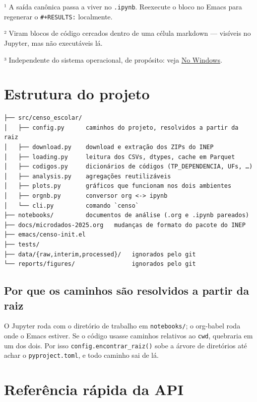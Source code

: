 \documentclass[11pt]{article}
\begin{document}
¹ A saída canônica passa a viver no \texttt{.ipynb}. Reexecute o bloco no Emacs para
regenerar o \texttt{\#+RESULTS:} localmente.

² Viram blocos de código cercados dentro de uma célula markdown — visíveis no
Jupyter, mas não executáveis lá.

³ Independente do sistema operacional, de propósito: veja \hyperref[sec:org266169a]{No Windows}.
\section*{Estrutura do projeto}
\label{sec:orgf6c494e}

\begin{verbatim}
├── src/censo_escolar/
│   ├── config.py      caminhos do projeto, resolvidos a partir da raiz
│   ├── download.py    download e extração dos ZIPs do INEP
│   ├── loading.py     leitura dos CSVs, dtypes, cache em Parquet
│   ├── codigos.py     dicionários de códigos (TP_DEPENDENCIA, UFs, …)
│   ├── analysis.py    agregações reutilizáveis
│   ├── plots.py       gráficos que funcionam nos dois ambientes
│   ├── orgnb.py       conversor org <-> ipynb
│   └── cli.py         comando `censo`
├── notebooks/         documentos de análise (.org e .ipynb pareados)
├── docs/microdados-2025.org   mudanças de formato do pacote do INEP
├── emacs/censo-init.el
├── tests/
├── data/{raw,interim,processed}/   ignorados pelo git
└── reports/figures/                ignorados pelo git
\end{verbatim}
\subsection*{Por que os caminhos são resolvidos a partir da raiz}
\label{sec:org609b06f}

O Jupyter roda com o diretório de trabalho em \texttt{notebooks/}; o org-babel roda
onde o Emacs estiver. Se o código usasse caminhos relativos ao \texttt{cwd}, quebraria
em um dos dois. Por isso \texttt{config.encontrar\_raiz()} sobe a árvore de diretórios
até achar o \texttt{pyproject.toml}, e todo caminho sai de lá.
\section*{Referência rápida da API}
\label{sec:org77d421a}
\end{document}
